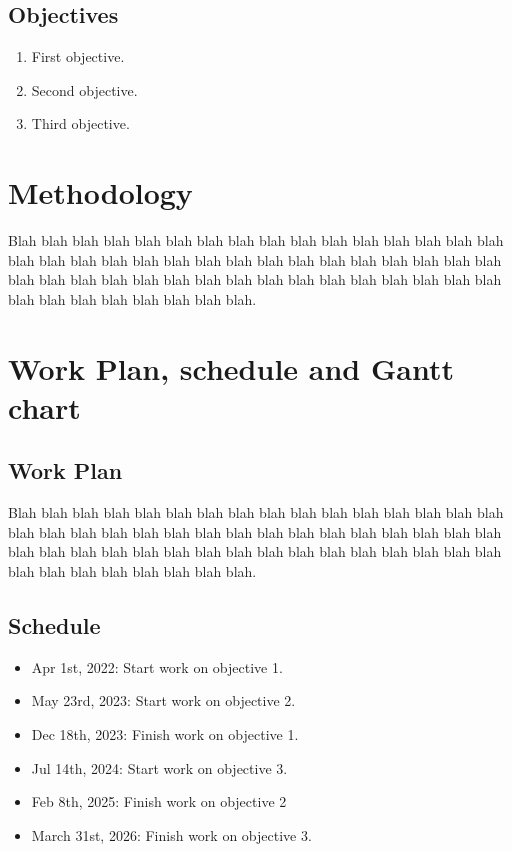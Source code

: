 \subsection{Objectives}
\begin{enumerate}
\item First objective.
\item Second objective.
\item Third objective.
\end{enumerate}

\section{Methodology}

Blah blah blah blah blah blah blah blah blah blah blah blah blah blah blah blah blah blah blah blah blah blah blah blah blah blah blah blah blah blah blah blah blah blah blah blah blah blah blah blah blah blah blah blah blah blah blah blah blah blah blah blah blah blah blah blah.

\section{Work Plan, schedule and Gantt chart}

\subsection{Work Plan}

Blah blah blah blah blah blah blah blah blah blah blah blah blah blah blah blah blah blah blah blah blah blah blah blah blah blah blah blah blah blah blah blah blah blah blah blah blah blah blah blah blah blah blah blah blah blah blah blah blah blah blah blah blah blah blah blah.

\subsection{Schedule}

\begin{itemize}
\item Apr 1st, 2022: Start work on objective 1.
\item May 23rd, 2023: Start work on objective 2.
\item Dec 18th, 2023: Finish work on objective 1.
\item Jul 14th, 2024: Start work on objective 3.
\item Feb 8th, 2025: Finish work on objective 2
\item March 31st, 2026: Finish work on objective 3.
\end{itemize}

